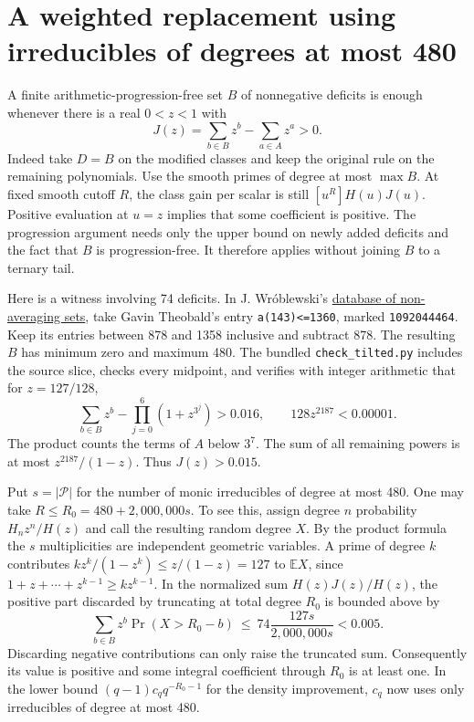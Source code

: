 \section{A weighted replacement using irreducibles of degrees at most 480}
\label{sec:tilted}
A finite arithmetic-progression-free set $B$ of nonnegative deficits is
enough whenever there is a real $0<z<1$ with
\begin{equation}
 J(z)=\sum_{b\in B}z^b-\sum_{a\in A}z^a>0 .
 \label{eq:tilt}
\end{equation}
Indeed take $D=B$ on the modified classes and keep the original rule on
the remaining polynomials. Use the smooth primes of degree at most $\max B$.
At fixed smooth cutoff $R$, the class gain per scalar is still
$[u^R]H(u)J(u)$. Positive evaluation at $u=z$ implies that some coefficient
is positive. The progression argument needs only the upper bound on newly
added deficits and the fact that $B$ is progression-free. It therefore
applies without joining $B$ to a ternary tail.

Here is a witness involving 74 deficits. In J. Wr\'oblewski's
\href{https://www.math.uni.wroc.pl/~jwr/non-ave/DATABASE.TXT}{database of
non-averaging sets}, take Gavin Theobald's entry
\texttt{a(143)<=1360}, marked \texttt{1092044464}. Keep its entries
between 878 and 1358 inclusive and subtract 878. The resulting $B$ has
minimum zero and maximum 480. The bundled \texttt{check\_tilted.py}
includes the source slice, checks every midpoint, and verifies with
integer arithmetic that for $z=127/128$,
\[
 \sum_{b\in B}z^b-\prod_{j=0}^6(1+z^{3^j})>0.016,
 \qquad 128z^{2187}<0.00001 .
\]
The product counts the terms of $A$ below $3^7$. The sum of all remaining
powers is at most $z^{2187}/(1-z)$. Thus $J(z)>0.015$.

Put $s=|\mathcal P|$ for the number of monic irreducibles of degree at most
480. One may take $R\le R_0=480+2{,}000{,}000s$. To see this, assign degree
$n$ probability $H_nz^n/H(z)$ and call the resulting random degree $X$.
By the product formula the $s$ multiplicities are independent geometric
variables. A prime of degree $k$ contributes $kz^k/(1-z^k)\le z/(1-z)=127$
to $\mathbb E X$, since $1+z+\cdots+z^{k-1}\ge kz^{k-1}$.
In the normalized sum $H(z)J(z)/H(z)$, the positive part discarded by
truncating at total degree $R_0$ is bounded above by
\[
 \sum_{b\in B}z^b\Pr(X>R_0-b)
 \ \le\ 74\frac{127s}{2{,}000{,}000s}<0.005 .
\]
Discarding negative contributions can only raise the truncated sum.
Consequently its value is positive and some integral coefficient through
$R_0$ is at least one. In the lower bound $(q-1)c_q q^{-R_0-1}$ for the
density improvement, $c_q$ now uses only irreducibles of degree at most 480.
